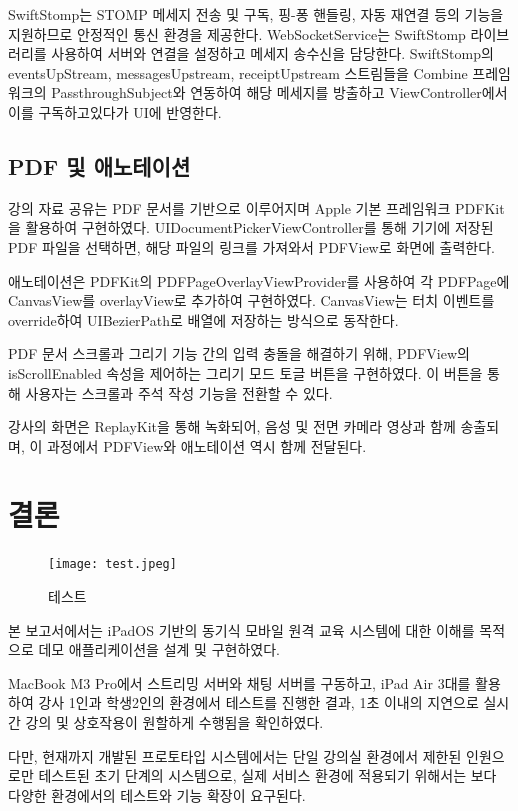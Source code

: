 \documentclass[10pt, a4paper, oneside]{article}
\begin{document}
SwiftStomp는 STOMP 메세지 전송 및 구독, 핑-퐁 핸들링, 자동 재연결 등의 기능을 지원하므로 안정적인 통신 환경을 제공한다. WebSocketService는 SwiftStomp 라이브러리를 사용하여 서버와 연결을 설정하고 메세지 송수신을 담당한다. SwiftStomp의 eventsUpStream, messagesUpstream, receiptUpstream 스트림들을 Combine 프레임워크의 PassthroughSubject와 연동하여 해당 메세지를 방출하고 ViewController에서 이를 구독하고있다가 UI에 반영한다.

\subsection{PDF 및 애노테이션}
강의 자료 공유는 PDF 문서를 기반으로 이루어지며 Apple 기본 프레임워크 PDFKit을 활용하여 구현하였다. UIDocumentPickerViewController를 통해 기기에 저장된 PDF 파일을 선택하면, 해당 파일의 링크를 가져와서 PDFView로 화면에 출력한다.

애노테이션은 PDFKit의 PDFPageOverlayViewProvider를 사용하여 각 PDFPage에 CanvasView를 overlayView로 추가하여 구현하였다. CanvasView는 터치 이벤트를 override하여 UIBezierPath로 배열에 저장하는 방식으로 동작한다.

PDF 문서 스크롤과 그리기 기능 간의 입력 충돌을 해결하기 위해, PDFView의 isScrollEnabled 속성을 제어하는 그리기 모드 토글 버튼을 구현하였다. 이 버튼을 통해 사용자는 스크롤과 주석 작성 기능을 전환할 수 있다.

강사의 화면은 ReplayKit을 통해 녹화되어, 음성 및 전면 카메라 영상과 함께 송출되며, 이 과정에서 PDFView와 애노테이션 역시 함께 전달된다.

\section{결론}
\begin{figure}[htbp]
    \begin{center}
    \texttt{[image: test.jpeg]}
    \caption{테스트}
    \label{fig:fig4}
    \end{center}
\end{figure}


본 보고서에서는 iPadOS 기반의 동기식 모바일 원격 교육 시스템에 대한 이해를 목적으로 데모 애플리케이션을 설계 및 구현하였다.

MacBook M3 Pro에서 스트리밍 서버와 채팅 서버를 구동하고, iPad Air 3대를 활용하여 강사 1인과 학생2인의 환경에서 테스트를 진행한 결과, 1초 이내의 지연으로 실시간 강의 및 상호작용이 원할하게 수행됨을 확인하였다.

다만, 현재까지 개발된 프로토타입 시스템에서는 단일 강의실 환경에서 제한된 인원으로만 테스트된 초기 단계의 시스템으로, 실제 서비스 환경에 적용되기 위해서는 보다 다양한 환경에서의 테스트와 기능 확장이 요구된다.
\end{document}
